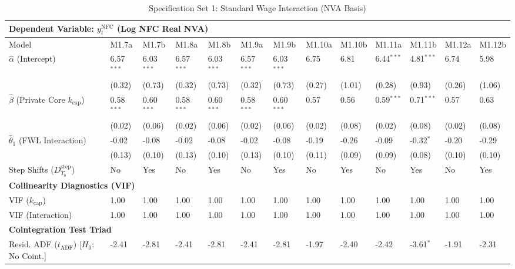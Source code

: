 \begin{table}[H]
\centering
\setlength{\tabcolsep}{2.5pt}
\caption{Specification Set 1: Standard Wage Interaction (NVA Basis)}
\label{tab:specA_set1_nva}
\scriptsize
\begin{tabular}{p{3.8cm}p{1.1cm}p{1.1cm}p{1.1cm}p{1.1cm}p{1.1cm}p{1.1cm}p{1.1cm}p{1.1cm}p{1.1cm}p{1.1cm}p{1.1cm}p{1.1cm}}
\toprule
\multicolumn{13}{l}{\textbf{Dependent Variable: $y_t^{\text{NFC}}$ (Log NFC Real NVA)}} \\
\midrule
Model & M1.7a & M1.7b & M1.8a & M1.8b & M1.9a & M1.9b & M1.10a & M1.10b & M1.11a & M1.11b & M1.12a & M1.12b \\
\midrule
$\hat{\alpha}$ (Intercept) & 6.57$^{***}$ & 6.03$^{***}$ & 6.57$^{***}$ & 6.03$^{***}$ & 6.57$^{***}$ & 6.03$^{***}$ & 6.75 & 6.81 & 6.44$^{***}$ & 4.81$^{***}$ & 6.74 & 5.98 \\
 & (0.32) & (0.73) & (0.32) & (0.73) & (0.32) & (0.73) & (0.27) & (1.01) & (0.28) & (0.93) & (0.26) & (1.06) \\
$\hat{\beta}$ (Private Core $k_{\text{cap}}$) & 0.58$^{***}$ & 0.60$^{***}$ & 0.58$^{***}$ & 0.60$^{***}$ & 0.58$^{***}$ & 0.60$^{***}$ & 0.57 & 0.56 & 0.59$^{***}$ & 0.71$^{***}$ & 0.57 & 0.63 \\
 & (0.02) & (0.06) & (0.02) & (0.06) & (0.02) & (0.06) & (0.02) & (0.08) & (0.02) & (0.08) & (0.02) & (0.08) \\
$\hat{\theta}_1$ (FWL Interaction) & -0.02 & -0.08 & -0.02 & -0.08 & -0.02 & -0.08 & -0.19 & -0.26 & -0.09 & -0.32$^{*}$ & -0.20 & -0.29 \\
 & (0.13) & (0.10) & (0.13) & (0.10) & (0.13) & (0.10) & (0.11) & (0.09) & (0.09) & (0.08) & (0.10) & (0.10) \\
Step Shifts ($D_{T_b}^{\text{step}}$) & No & Yes & No & Yes & No & Yes & No & Yes & No & Yes & No & Yes \\
\midrule
\multicolumn{13}{l}{\textbf{Collinearity Diagnostics (VIF)}} \\
VIF ($k_{\text{cap}}$) & 1.00 & 1.00 & 1.00 & 1.00 & 1.00 & 1.00 & 1.00 & 1.00 & 1.00 & 1.00 & 1.00 & 1.00 \\
VIF (Interaction) & 1.00 & 1.00 & 1.00 & 1.00 & 1.00 & 1.00 & 1.00 & 1.00 & 1.00 & 1.00 & 1.00 & 1.00 \\
\midrule
\multicolumn{13}{l}{\textbf{Cointegration Test Triad}} \\
Resid. ADF ($t_{\text{ADF}}$) [$H_0$: No Coint.] & -2.41 & -2.81 & -2.41 & -2.81 & -2.41 & -2.81 & -1.97 & -2.40 & -2.42 & -3.61$^{*}$ & -1.91 & -2.31 \\

\end{tabular}
\end{table}
